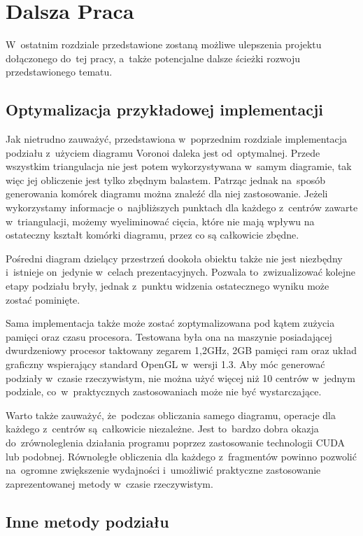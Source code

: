 \documentclass[skorowidz,autorrok,backref,xodstep,oswiadczenie]{wmimgr}
\begin{document}
\chapter{Dalsza Praca}

W~ostatnim rozdziale przedstawione zostaną możliwe ulepszenia projektu dołączonego do~tej pracy, a~także potencjalne dalsze ścieżki rozwoju przedstawionego tematu.

\section{Optymalizacja przykładowej implementacji}

Jak nietrudno zauważyć, przedstawiona w~poprzednim rozdziale implementacja podziału z~użyciem diagramu Voronoi daleka jest od~optymalnej. Przede wszystkim triangulacja nie jest potem wykorzystywana w~samym diagramie, tak więc jej obliczenie jest tylko zbędnym balastem. Patrząc jednak na~sposób generowania komórek diagramu można znaleźć dla niej zastosowanie. Jeżeli wykorzystamy informacje o~najbliższych punktach dla każdego z~centrów zawarte w~triangulacji, możemy wyeliminować cięcia, które nie mają wpływu na ostateczny kształt komórki diagramu, przez co są całkowicie zbędne.

Pośredni diagram dzielący przestrzeń dookoła obiektu także nie jest niezbędny i~istnieje on~jedynie w~celach prezentacyjnych. Pozwala to~zwizualizować kolejne etapy podziału bryły, jednak z~punktu widzenia ostatecznego wyniku może zostać pominięte.

Sama implementacja także może zostać zoptymalizowana pod kątem zużycia pamięci oraz czasu procesora. Testowana była ona na maszynie posiadającej dwurdzeniowy procesor taktowany zegarem 1,2GHz, 2GB pamięci ram oraz układ graficzny wspierający standard OpenGL w~wersji 1.3. Aby móc generować podziały w~czasie rzeczywistym, nie można użyć więcej niż 10 centrów w~jednym podziale, co~w~praktycznych zastosowaniach może nie być wystarczające.

Warto także zauważyć, że~podczas obliczania samego diagramu, operacje dla każdego z~centrów są~całkowicie niezależne. Jest to~bardzo dobra okazja do~zrównoleglenia działania programu poprzez zastosowanie technologii CUDA lub podobnej. Równoległe obliczenia dla każdego z~fragmentów powinno pozwolić na~ogromne zwiększenie wydajności i~umożliwić praktyczne zastosowanie zaprezentowanej metody w~czasie rzeczywistym.

\section{Inne metody podziału}
\end{document}
